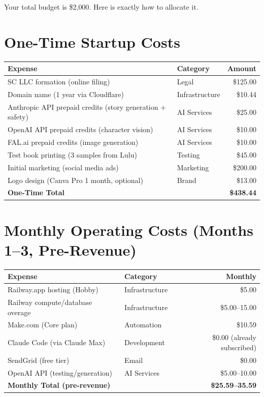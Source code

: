 \documentclass[12pt, letterpaper, oneside]{book}
\begin{document}
Your total budget is \$2{,}000. Here is exactly how to allocate it.

\section{One-Time Startup Costs}

\begin{table}[H]
\centering
\begin{tabularx}{\textwidth}{Xlr}
\toprule
\textbf{Expense} & \textbf{Category} & \textbf{Amount} \\
\midrule
SC LLC formation (online filing) & Legal & \$125.00 \\
Domain name (1 year via Cloudflare) & Infrastructure & \$10.44 \\
Anthropic API prepaid credits (story generation + safety) & AI Services & \$25.00 \\
OpenAI API prepaid credits (character vision) & AI Services & \$10.00 \\
FAL.ai prepaid credits (image generation) & AI Services & \$10.00 \\
Test book printing (3 samples from Lulu) & Testing & \$45.00 \\
Initial marketing (social media ads) & Marketing & \$200.00 \\
Logo design (Canva Pro 1 month, optional) & Brand & \$13.00 \\
\midrule
\textbf{One-Time Total} & & \textbf{\$438.44} \\
\bottomrule
\end{tabularx}
\end{table}

\section{Monthly Operating Costs (Months 1--3, Pre-Revenue)}

\begin{table}[H]
\centering
\begin{tabularx}{\textwidth}{Xlr}
\toprule
\textbf{Expense} & \textbf{Category} & \textbf{Monthly} \\
\midrule
Railway.app hosting (Hobby) & Infrastructure & \$5.00 \\
Railway compute/database overage & Infrastructure & \$5.00--15.00 \\
Make.com (Core plan) & Automation & \$10.59 \\
Claude Code (via Claude Max) & Development & \$0.00 (already subscribed) \\
SendGrid (free tier) & Email & \$0.00 \\
OpenAI API (testing/generation) & AI Services & \$5.00--10.00 \\
\midrule
\textbf{Monthly Total (pre-revenue)} & & \textbf{\$25.59--35.59} \\
\bottomrule
\end{tabularx}
\end{table}
\end{document}
